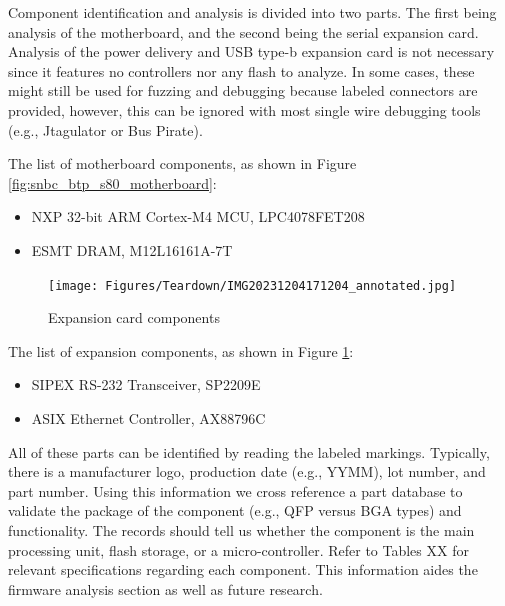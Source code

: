Component identification and analysis is divided into two parts. The first being analysis of the motherboard, and the second being the serial expansion card. Analysis of the power delivery and USB type-b expansion card is not necessary since it features no controllers nor any flash to analyze. In some cases, these might still be used for fuzzing and debugging because labeled connectors are provided, however, this can be ignored with most single wire debugging tools (e.g., Jtagulator or Bus Pirate).

The list of motherboard components, as shown in Figure \ref{fig:snbc_btp_s80_motherboard}:
\begin{itemize}
    \item NXP 32-bit ARM Cortex-M4 MCU, LPC4078FET208
    \item ESMT DRAM, M12L16161A-7T
\end{itemize}

\begin{figure}[ht]
    \centering
    {\texttt{[image: Figures/Teardown/IMG20231204171204\_annotated.jpg]}}
    \caption{Expansion card components}
    \label{fig:snbc_btp_s80_expansion_components}
\end{figure}

The list of expansion components, as shown in Figure \ref{fig:snbc_btp_s80_expansion_components}:
\begin{itemize}
    \item SIPEX RS-232 Transceiver, SP2209E
    \item ASIX Ethernet Controller, AX88796C
\end{itemize}

All of these parts can be identified by reading the labeled markings. Typically, there is a manufacturer logo, production date (e.g., YYMM), lot number, and part number. Using this information we cross reference a part database to validate the package of the component (e.g., QFP versus BGA types) and functionality. The records should tell us whether the component is the main processing unit, flash storage, or a micro-controller. Refer to Tables XX for relevant specifications regarding each component. This information aides the firmware analysis section as well as future research.

